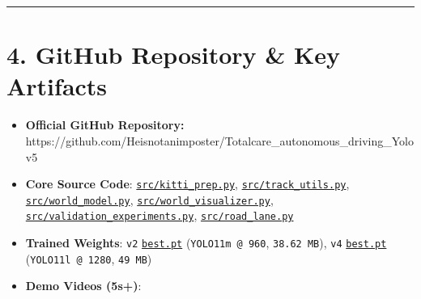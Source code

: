 \documentclass[10.5pt,a4paper]{article}
\begin{document}
\par\noindent\rule{\textwidth}{0.4pt}\par\medskip

\section{4. GitHub Repository \& Key Artifacts}

\begin{itemize}[leftmargin=1.5em,itemsep=2pt]
\item \textbf{Official GitHub Repository:} https:\allowbreak{}/\allowbreak{}/\allowbreak{}github.\allowbreak{}com/\allowbreak{}Heisnotanimposter/\allowbreak{}Totalcare\_\allowbreak{}autonomous\_\allowbreak{}driving\_\allowbreak{}Yolov5
\item \textbf{Core Source Code}: \href{https://github.com/Heisnotanimposter/Totalcare\_autonomous\_driving\_Yolov5/blob/main/src/kitti\_prep.py}{\texttt{src/\allowbreak{}kitti\_\allowbreak{}prep.\allowbreak{}py}}, \href{https://github.com/Heisnotanimposter/Totalcare\_autonomous\_driving\_Yolov5/blob/main/src/track\_utils.py}{\texttt{src/\allowbreak{}track\_\allowbreak{}utils.\allowbreak{}py}}, \href{https://github.com/Heisnotanimposter/Totalcare\_autonomous\_driving\_Yolov5/blob/main/src/world\_model.py}{\texttt{src/\allowbreak{}world\_\allowbreak{}model.\allowbreak{}py}}, \href{https://github.com/Heisnotanimposter/Totalcare\_autonomous\_driving\_Yolov5/blob/main/src/world\_visualizer.py}{\texttt{src/\allowbreak{}world\_\allowbreak{}visualizer.\allowbreak{}py}}, \href{https://github.com/Heisnotanimposter/Totalcare\_autonomous\_driving\_Yolov5/blob/main/src/validation\_experiments.py}{\texttt{src/\allowbreak{}validation\_\allowbreak{}experiments.\allowbreak{}py}}, \href{https://github.com/Heisnotanimposter/Totalcare\_autonomous\_driving\_Yolov5/blob/main/src/road\_lane.py}{\texttt{src/\allowbreak{}road\_\allowbreak{}lane.\allowbreak{}py}}
\item \textbf{Trained Weights}: \texttt{v2} \href{https://github.com/Heisnotanimposter/Totalcare\_autonomous\_driving\_Yolov5/blob/main/results/v2\_improved/outputs/weights/best.pt}{\texttt{best.\allowbreak{}pt}} (\texttt{YOLO11m @ 960}, \texttt{38.\allowbreak{}62 MB}), \texttt{v4} \href{https://github.com/Heisnotanimposter/Totalcare\_autonomous\_driving\_Yolov5/blob/main/results/v4\_road\_lane/detect\_outputs/outputs/weights/best.pt}{\texttt{best.\allowbreak{}pt}} (\texttt{YOLO11l @ 1280}, \texttt{49 MB})
\item \textbf{Demo Videos (5s+)}:

\end{itemize}
\end{document}
